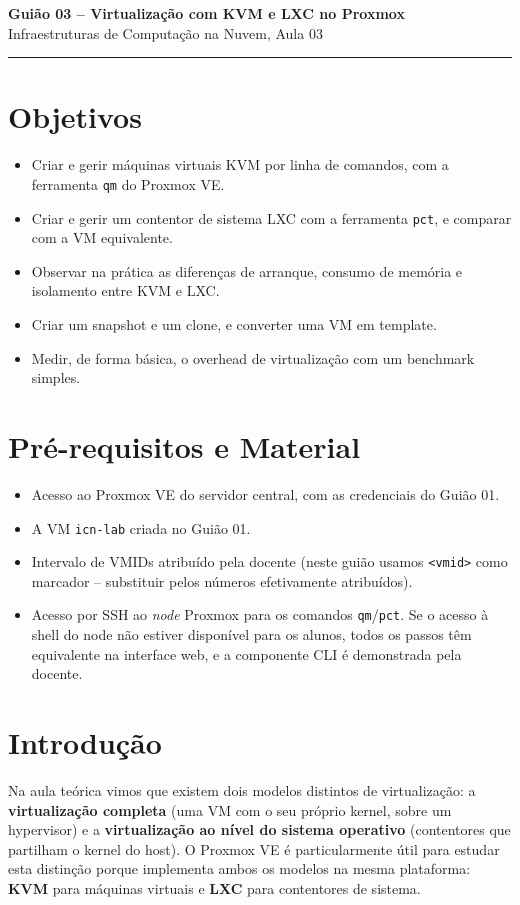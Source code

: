 \documentclass[11pt,a4paper]{article}
\newcommand{\guiaotitle}[2]{%
  \begin{center}
  {\Large\bfseries\color{TextEspresso} #1}\\[0.3cm]
  {\normalsize\color{NudeTaupe} #2}\\[0.2cm]
  {\color{NudeTaupe}\rule{4cm}{0.5pt}}
  \end{center}
  \vspace{0.5cm}
}
\begin{document}
\guiaotitle{Guião 03 -- Virtualização com KVM e LXC no Proxmox}{Infraestruturas de Computação na Nuvem, Aula 03}

\section{Objetivos}
\begin{itemize}[itemsep=0.2cm]
  \item Criar e gerir máquinas virtuais KVM por linha de comandos, com a ferramenta \texttt{qm} do Proxmox VE.
  \item Criar e gerir um contentor de sistema LXC com a ferramenta \texttt{pct}, e comparar com a VM equivalente.
  \item Observar na prática as diferenças de arranque, consumo de memória e isolamento entre KVM e LXC.
  \item Criar um snapshot e um clone, e converter uma VM em template.
  \item Medir, de forma básica, o overhead de virtualização com um benchmark simples.
\end{itemize}

\section{Pré-requisitos e Material}
\begin{itemize}[itemsep=0.2cm]
  \item Acesso ao Proxmox VE do servidor central, com as credenciais do Guião 01.
  \item A VM \texttt{icn-lab} criada no Guião 01.
  \item Intervalo de VMIDs atribuído pela docente (neste guião usamos \texttt{<vmid>} como marcador -- substituir pelos números efetivamente atribuídos).
  \item Acesso por SSH ao \emph{node} Proxmox para os comandos \texttt{qm}/\texttt{pct}. Se o acesso à shell do node não estiver disponível para os alunos, todos os passos têm equivalente na interface web, e a componente CLI é demonstrada pela docente.
\end{itemize}

\section{Introdução}
Na aula teórica vimos que existem dois modelos distintos de virtualização: a \textbf{virtualização completa} (uma VM com o seu próprio kernel, sobre um hypervisor) e a \textbf{virtualização ao nível do sistema operativo} (contentores que partilham o kernel do host). O Proxmox VE é particularmente útil para estudar esta distinção porque implementa ambos os modelos na mesma plataforma: \textbf{KVM} para máquinas virtuais e \textbf{LXC} para contentores de sistema.
\end{document}

